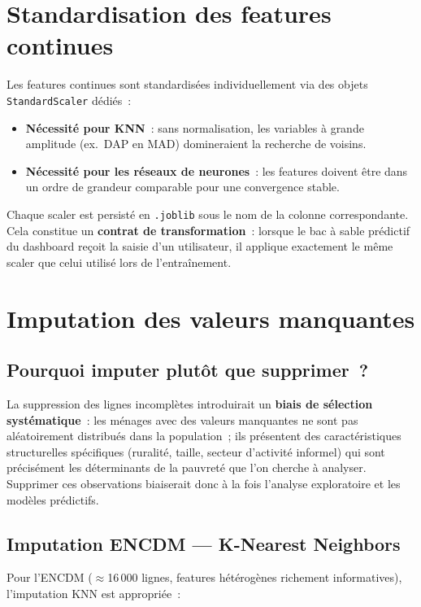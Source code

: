 \documentclass[12pt,a4paper]{report}
\begin{document}
\section{Standardisation des features continues}

Les features continues sont standardisées individuellement via des objets \texttt{StandardScaler} dédiés~:

\begin{itemize}
  \item \textbf{Nécessité pour KNN}~: sans normalisation, les variables à grande amplitude (ex.\ DAP en MAD) domineraient la recherche de voisins.
  \item \textbf{Nécessité pour les réseaux de neurones}~: les features doivent être dans un ordre de grandeur comparable pour une convergence stable.
\end{itemize}

Chaque scaler est persisté en \texttt{.joblib} sous le nom de la colonne correspondante. Cela constitue un \textbf{contrat de transformation}~: lorsque le bac à sable prédictif du dashboard reçoit la saisie d'un utilisateur, il applique exactement le même scaler que celui utilisé lors de l'entraînement.

\section{Imputation des valeurs manquantes}

\subsection{Pourquoi imputer plutôt que supprimer~?}

La suppression des lignes incomplètes introduirait un \textbf{biais de sélection systématique}~: les ménages avec des valeurs manquantes ne sont pas aléatoirement distribués dans la population~; ils présentent des caractéristiques structurelles spécifiques (ruralité, taille, secteur d'activité informel) qui sont précisément les déterminants de la pauvreté que l'on cherche à analyser. Supprimer ces observations biaiserait donc à la fois l'analyse exploratoire et les modèles prédictifs.

\subsection{Imputation ENCDM --- K-Nearest Neighbors}

Pour l'ENCDM ($\approx$16\,000 lignes, features hétérogènes richement informatives), l'imputation KNN est appropriée~:
\end{document}
